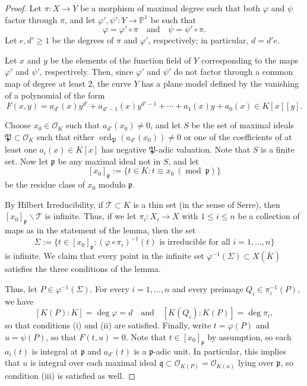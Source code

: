 \documentclass[12pt]{amsart}
\theoremstyle{definition}
\newcommand{\bbP}{\mathbb{P}}
\newcommand{\calO}{\mathcal{O}}
\newcommand{\calT}{\mathcal{T}}
\newcommand{\frakP}{\mathfrak{P}}
\newcommand{\frakp}{\mathfrak{p}}
\newcommand{\frakq}{\mathfrak{q}}
\newcommand{\Kbar}{\overline{K}}
\newcommand{\ord}{\operatorname{ord}}
\newcommand{\Mod}[1]{\ \left(\operatorname{mod}\ {#1}\right)}
\numberwithin{equation}{section}
\begin{document}
\begin{proof}
Let $\pi : X \to Y$ be a morphism of maximal degree such that both $\varphi$ and $\psi$ factor through $\pi$, and let $\varphi',\psi' : Y \to \bbP^1$ be such that
    \[
        \varphi = \varphi' \circ \pi \quad\text{and}\quad \psi = \psi' \circ\pi.
    \]
Let $e, d' \ge 1$ be the degrees of $\pi$ and $\varphi'$, respectively; in particular, $d = d'e$.

Let $x$ and $y$ be the elements of the function field of $Y$ corresponding to the maps $\varphi'$ and $\psi'$, respectively. Then, since $\varphi'$ and $\psi'$ do not factor through a common map of degree at least $2$, the curve $Y$ has a plane model defined by the vanishing of a polynomial of the form
    \[
        F(x,y) = a_{d'}(x)y^{d'} + a_{d'-1}(x)y^{d'-1} + \cdots + a_1(x)y + a_0(x) \in K[x][y].
    \]

Choose $x_0 \in \calO_K$ such that $a_{d'}(x_0) \ne 0$, and let $S$ be the set of maximal ideals $\frakP \subset \calO_K$ such that either $\ord_\frakP(a_{d'}(x_0)) \ne 0$ or one of the coefficients of at least one $a_i(x) \in K[x]$ has negative $\frakP$-adic valuation. Note that $S$ is a finite set. Now let $\frakp$ be any maximal ideal not in $S$, and let
    \[
    [x_0]_\frakp := \{t \in K : t\equiv x_0 \Mod \frakp\}
    \]
be the residue class of $x_0$ modulo $\frakp$.

By Hilbert Irreducibility, if $\calT \subset K$ is a thin set (in the sense of Serre), then $[x_0]_\frakp \smallsetminus \calT$ is infinite.
Thus, if we let $\pi_i : X_i \to X$ with $1\le i \le n$ be a collection of maps as in the statement of the lemma, then the set
    \[
    \Sigma := \{t \in [x_0]_\frakp : (\varphi\circ\pi_i)^{-1}(t) \text{ is irreducible for all } i = 1,\ldots,n\}
    \]
is infinite. We claim that every point in the infinite set $\varphi^{-1}(\Sigma) \subset X(\Kbar)$ satisfies the three conditions of the lemma.

Thus, let $P \in \varphi^{-1}(\Sigma)$. For every $i = 1,\ldots,n$ and every preimage $Q_i\in\pi_i^{-1}(P)$, we have
    \[
        [K(P) : K] = \deg \varphi = d \quad\text{and}\quad [K(Q_i) : K(P)] = \deg\pi_i,
    \]
so that conditions (i) and (ii) are satisfied.
Finally, write $t = \varphi(P)$ and $u = \psi(P)$, so that $F(t,u) = 0$. Note that $t \in [x_0]_\frakp$ by assumption, so each $a_i(t)$ is integral at $\frakp$ and $a_{d'}(t)$ is a $\frakp$-adic unit. In particular, this implies that $u$ is integral over each maximal ideal $\frakq \subset \calO_{K(P)} = \calO_{K(u)}$ lying over $\frakp$, so condition (iii) is satisfied as well.
\end{proof}
\end{document}
